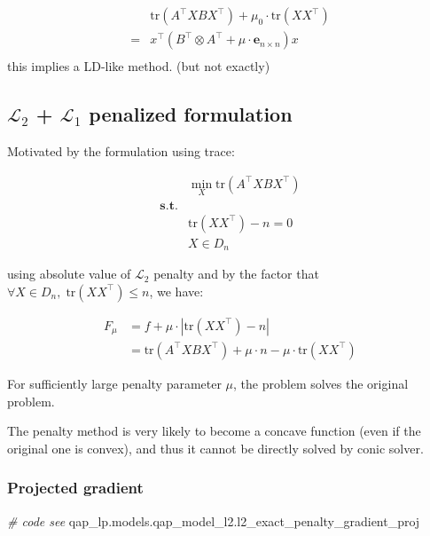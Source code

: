 \documentclass[
  10pt,
  a4paper,
,tablecaptionabove
]{scrartcl}
\newenvironment{Shaded}{}{}
\newcommand{\CommentTok}[1]{\textcolor[rgb]{0.38,0.63,0.69}{\textit{#1}}}
\newcommand{\NormalTok}[1]{#1}
\begin{document}
\[\begin{aligned}
&\textrm{tr}(A^\top XB X^\top) + \mu_0 \cdot \textrm{tr}(X X^{\top}) \\
= & x^\top (B^\top \otimes A^\top + \mu\cdot  \mathbf e_{n\times n}) x\\ 
\end{aligned} \] this implies a LD-like method. (but not exactly)

\hypertarget{mathscr-l_2-mathscr-l_1-penalized-formulation}{%
\subsection{\texorpdfstring{\(\mathscr L_2\) + \(\mathscr L_1\)
penalized
formulation}{\textbackslash mathscr L\_2 + \textbackslash mathscr L\_1 penalized formulation}}\label{mathscr-l_2-mathscr-l_1-penalized-formulation}}

Motivated by the formulation using trace:

\[\begin{aligned}
& \min_X  \textrm{tr}(A^\top XB X^\top) \\
\mathbf{s.t.} &\\
&   \textrm{tr}(XX^\top ) -  n = 0 \\
& X \in D_n
\end{aligned}\]

using absolute value of \(\mathscr L_2\) penalty and by the factor that
\(\forall X \in D_n ,\; \textrm{tr}(XX^\top)\le n\), we have:

\[\begin{aligned}
F_{\mu} & =  f  + \mu\cdot | \textrm{tr}(XX^\top ) -  n| \\
 &= \textrm{tr}(A^\top XB X^\top)  + \mu\cdot n - \mu\cdot \textrm{tr}(XX^\top )
\end{aligned}\]

For sufficiently large penalty parameter \(\mu\), the problem solves the
original problem.

The penalty method is very likely to become a concave function (even if
the original one is convex), and thus it cannot be directly solved by
conic solver.

\hypertarget{projected-gradient}{%
\subsubsection{Projected gradient}\label{projected-gradient}}

\begin{Shaded}
\begin{Highlighting}[]
\CommentTok{\# code see}
\NormalTok{qap\_lp.models.qap\_model\_l2.l2\_exact\_penalty\_gradient\_proj}
\end{Highlighting}
\end{Shaded}
\end{document}
